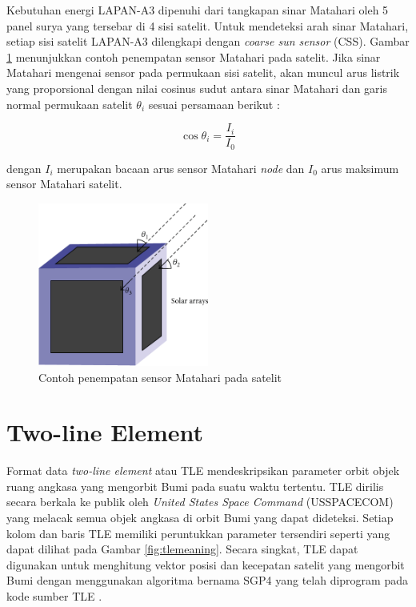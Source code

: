 Kebutuhan energi LAPAN-A3 dipenuhi dari tangkapan sinar Matahari oleh 5 panel
surya yang tersebar di 4 sisi satelit. Untuk mendeteksi arah sinar Matahari,
setiap sisi satelit LAPAN-A3 dilengkapi dengan \textit{coarse sun sensor}
(CSS). Gambar \ref{fig:css} menunjukkan contoh penempatan sensor Matahari pada
satelit. Jika sinar Matahari mengenai sensor pada permukaan sisi satelit, akan
muncul arus listrik yang proporsional dengan nilai cosinus sudut antara sinar
Matahari dan garis normal permukaan satelit $\theta_i$ sesuai persamaan berikut
\cite{zahran2009}:

\begin{equation}
\label{eq:current}
	\cos{\theta_i} = \frac{I_i}{I_0}
\end{equation}

dengan $I_i$ merupakan bacaan arus sensor Matahari \textit{node} dan $I_0$ arus
maksimum sensor Matahari satelit.

\begin{figure}[H]
\setlength{}
\begin{center}
\includegraphics[width=0.5\textwidth]{fig/css.png}
	\caption[Contoh penempatan sensor Matahari pada satelit]{Contoh penempatan sensor Matahari pada satelit~\cite{post2013}}
\label{fig:css}
\end{center}
\end{figure}

\section{Two-line Element}

Format data \textit{two-line element} atau TLE mendeskripsikan parameter orbit
objek ruang angkasa yang mengorbit Bumi pada suatu waktu tertentu. TLE dirilis
secara berkala ke publik oleh \textit{United States Space Command} (USSPACECOM)
yang melacak semua objek angkasa di orbit Bumi yang dapat dideteksi. Setiap
kolom dan baris TLE memiliki peruntukkan parameter tersendiri seperti yang
dapat dilihat pada Gambar \ref{fig:tlemeaning}. Secara singkat, TLE dapat
digunakan untuk menghitung vektor posisi dan kecepatan satelit yang mengorbit
Bumi dengan menggunakan algoritma bernama SGP4 yang telah diprogram pada kode
sumber TLE \cite{vallado2008}.

